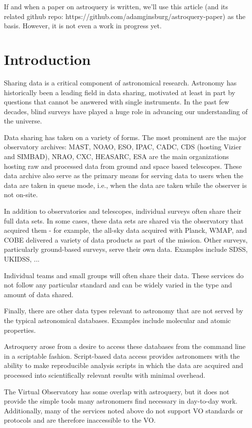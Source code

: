 If and when a paper on astroquery is written, we'll use this article (and its
related github repo: https://github.com/adamginsburg/astroquery-paper) as the
basis.  However, it is not even a work in progress yet.

\section{Introduction}
Sharing data is a critical component of astronomical research.  Astronomy
has historically been a leading field in data sharing, motivated at least
in part by questions that cannot be answered with single instruments.
In the past few decades, blind surveys have played a huge role in advancing our
understanding of the universe.

Data sharing has taken on a variety of forms.  The most prominent are the major
observatory archives: MAST, NOAO, ESO, IPAC, CADC, CDS (hosting Vizier and
SIMBAD), NRAO, CXC, HEASARC, ESA are the main
organizations hosting raw and processed data from ground and space based
telescopes.  These data archive also serve as the primary means for serving data
to users when the data are taken in queue mode, i.e., when the data are taken
while the observer is not on-site.

In addition to observatories and telescopes, individual surveys often share
their full data sets.  In some cases, these data sets are shared via the
observatory that acquired them - for example, the all-sky data acquired with
Planck, WMAP, and COBE delivered a variety of data products as part of the
mission.  Other surveys, particularly ground-based surveys, serve their own
data.  Examples include SDSS, UKIDSS, ...

Individual teams and small groups will often share their data.
These services do not follow any particular standard and can be widely
varied in the type and amount of data shared.

Finally, there are other data types relevant to astronomy that are not
served by the typical astronomical databases.  Examples include molecular
and atomic properties.

Astroquery arose from a desire to access these databases from the command line
in a scriptable fashion.  Script-based data access provides astronomers with
the ability to make reproducible analysis scripts in which the data are
acquired and processed into scientifically relevant results with minimal
overhead.

The Virtual Observatory has some overlap with astroquery, but it does not
provide the simple tools many astronomers find necessary in day-to-day work.
Additionally, many of the services noted above do not support VO standards or
protocols and are therefore inaccessible to the VO.


